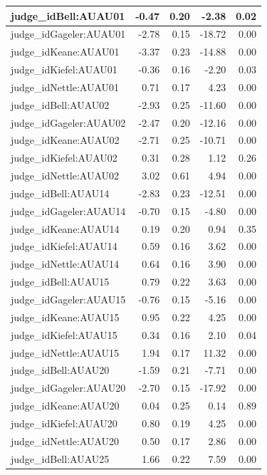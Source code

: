 \documentclass{monashthesis}
\begin{document}
\begin{tabular}{l|r|r|r|r}
\hline
judge\_idBell:AUAU01 & -0.47 & 0.20 & -2.38 & 0.02\\
\hline
judge\_idGageler:AUAU01 & -2.78 & 0.15 & -18.72 & 0.00\\
\hline
judge\_idKeane:AUAU01 & -3.37 & 0.23 & -14.88 & 0.00\\
\hline
judge\_idKiefel:AUAU01 & -0.36 & 0.16 & -2.20 & 0.03\\
\hline
judge\_idNettle:AUAU01 & 0.71 & 0.17 & 4.23 & 0.00\\
\hline
judge\_idBell:AUAU02 & -2.93 & 0.25 & -11.60 & 0.00\\
\hline
judge\_idGageler:AUAU02 & -2.47 & 0.20 & -12.16 & 0.00\\
\hline
judge\_idKeane:AUAU02 & -2.71 & 0.25 & -10.71 & 0.00\\
\hline
judge\_idKiefel:AUAU02 & 0.31 & 0.28 & 1.12 & 0.26\\
\hline
judge\_idNettle:AUAU02 & 3.02 & 0.61 & 4.94 & 0.00\\
\hline
judge\_idBell:AUAU14 & -2.83 & 0.23 & -12.51 & 0.00\\
\hline
judge\_idGageler:AUAU14 & -0.70 & 0.15 & -4.80 & 0.00\\
\hline
judge\_idKeane:AUAU14 & 0.19 & 0.20 & 0.94 & 0.35\\
\hline
judge\_idKiefel:AUAU14 & 0.59 & 0.16 & 3.62 & 0.00\\
\hline
judge\_idNettle:AUAU14 & 0.64 & 0.16 & 3.90 & 0.00\\
\hline
judge\_idBell:AUAU15 & 0.79 & 0.22 & 3.63 & 0.00\\
\hline
judge\_idGageler:AUAU15 & -0.76 & 0.15 & -5.16 & 0.00\\
\hline
judge\_idKeane:AUAU15 & 0.95 & 0.22 & 4.25 & 0.00\\
\hline
judge\_idKiefel:AUAU15 & 0.34 & 0.16 & 2.10 & 0.04\\
\hline
judge\_idNettle:AUAU15 & 1.94 & 0.17 & 11.32 & 0.00\\
\hline
judge\_idBell:AUAU20 & -1.59 & 0.21 & -7.71 & 0.00\\
\hline
judge\_idGageler:AUAU20 & -2.70 & 0.15 & -17.92 & 0.00\\
\hline
judge\_idKeane:AUAU20 & 0.04 & 0.25 & 0.14 & 0.89\\
\hline
judge\_idKiefel:AUAU20 & 0.80 & 0.19 & 4.25 & 0.00\\
\hline
judge\_idNettle:AUAU20 & 0.50 & 0.17 & 2.86 & 0.00\\
\hline
judge\_idBell:AUAU25 & 1.66 & 0.22 & 7.59 & 0.00\\

\end{tabular}
\end{document}
